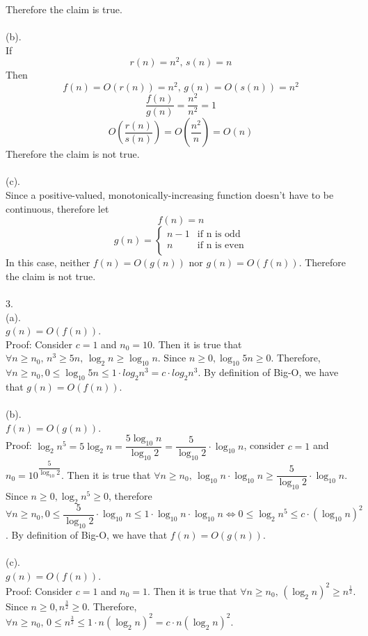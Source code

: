 \documentclass{article}
\begin{document}
Therefore the claim is true.
\\
\\
(b).
\\
If $$r(n)=n^2,\,s(n)=n$$
Then $$f(n)=O(r(n))=n^2,\,g(n)=O(s(n))=n^2$$
$$\dfrac{f(n)}{g(n)}=\dfrac{n^2}{n^2}=1$$
$$O(\dfrac{r(n)}{s(n)})=O(\dfrac{n^2}{n})=O(n)$$
Therefore the claim is not true.
\\
\\
(c).
\\
Since a positive-valued, monotonically-increasing function doesn't have to be continuous, therefore let
$$f(n)=n$$
\[
  g(n) =
  \begin{cases}
  n-1& \text{if n is odd} \\
  n & \text{if n is even} \\
  \end{cases}
\]
In this case, neither $f(n)=O(g(n))$ nor $g(n)=O(f(n))$. Therefore the claim is not true.
\\
\\
3.
\\
(a).
\\
$g(n)=O(f(n))$.
\\
Proof: Consider $c=1$ and $n_{0}=10$. Then it is true that $\forall n\geq n_{0},\, n^3\geq5n,\,\log_{2} n\geq\log_{10} n$. Since $n\geq 0, \log_{10} 5n \geq 0$. Therefore, $\forall n\geq n_{0}, 0\leq \log_{10} 5n\leq 1\cdot log_{2} n^3=c\cdot log_{2} n^3$.
By definition of Big-O, we have that $g(n)=O(f(n))$.
\\
\\
(b).
\\
$f(n)=O(g(n))$.
\\
Proof: $\log_{2} n^5=5\log_{2} n=\dfrac{5\log_{10} n}{\log_{10} 2}=\dfrac{5}{\log_{10} 2}\cdot \log_{10} n$, consider $c=1$ and $n_{0}=10^{\dfrac{5}{\log_{10} 2}}$. Then it is true that $\forall n\geq n_{0},\,\log_{10} n\cdot \log_{10} n\geq \dfrac{5}{\log_{10} 2}\cdot \log_{10} n$. Since $n\geq 0, \log_{2} n^5\geq 0$, therefore $\forall n\geq n_{0}, 0\leq \dfrac{5}{\log_{10} 2}\cdot \log_{10} n \leq 1\cdot \log_{10} n\cdot \log_{10} n \iff 0\leq \log_{2} n^5 \leq c\cdot (\log_{10} n)^2$.
By definition of Big-O, we have that $f(n)=O(g(n))$.
\\
\\
(c).
\\
$g(n)=O(f(n))$.
\\
Proof: Consider $c=1$ and $n_{0}=1$. Then it is true that $\forall n\geq n_{0},\, (\log_{2} n)^2\geq n^{\frac{1}{2}}$. Since $n\geq 0, n^{\frac{3}{2}}\geq 0$. Therefore, $\forall n\geq n_{0},\,0\leq n^{\frac{3}{2}}\leq 1\cdot n(\log_{2} n)^2=c\cdot n(\log_{2} n)^2$.
\end{document}
